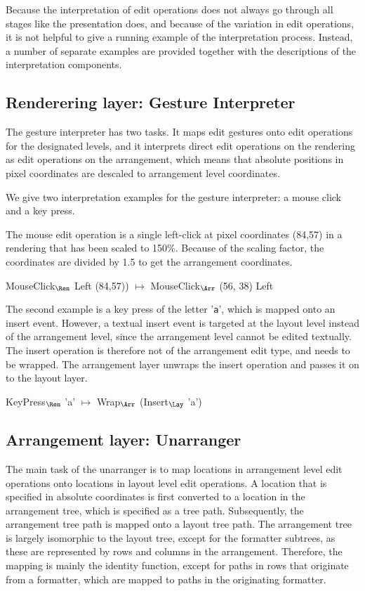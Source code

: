 Because the interpretation of edit operations does not always go through all stages like the presentation does, and because of the variation in edit operations, it is not helpful to give a running example of the interpretation process. Instead, a number of separate examples are provided together with the descriptions of the interpretation components.

%																
\subsection{Renderering layer: Gesture Interpreter} \label{sect:gestureInterpreter}

The gesture interpreter has two tasks. It maps edit gestures onto edit operations for the designated levels, and it interprets direct edit operations on the rendering as edit operations on the arrangement, which means that absolute positions in pixel coordinates are descaled to arrangement level coordinates. 

We give two interpretation examples for the gesture interpreter: a mouse click and a key press. 

The mouse edit operation is a single left-click at pixel coordinates (84,57) in a rendering that has been scaled to 150\%.
Because of the scaling factor, the coordinates are divided by 1.5 to get the arrangement coordinates.

\ttfamily
MouseClick$_{\Ren}$ Left (84,57)) $\mapsto$ MouseClick$_{\Arr}$ (56, 38) Left\\
\rmfamily

The second example is a key press of the letter '\verb|a|', which is mapped onto an insert event. However, a textual insert event is targeted at the layout level instead of the arrangement level, since the arrangement level cannot be edited textually. The insert operation is therefore not of the arrangement edit type, and needs to be wrapped. The arrangement layer unwraps the insert operation and passes it on to the layout layer.

\ttfamily
KeyPress$_{\Ren}$ 'a' $\mapsto$ Wrap$_{\Arr}$ (Insert$_{\Lay}$ 'a')
\rmfamily


%																
\subsection{Arrangement layer: Unarranger}

The main task of the unarranger is to map locations in arrangement level edit operations onto locations in layout level edit operations. A location that is specified in absolute coordinates is first converted to a location in the arrangement tree, which is specified as a tree path. Subsequently, the arrangement tree path is mapped onto a layout tree path. The arrangement tree is largely isomorphic to the layout tree, except for the formatter subtrees, as these are represented by rows and columns in the arrangement. Therefore, the mapping is mainly the identity function, except for paths in rows that originate from a formatter, which are mapped to paths in the originating formatter.

